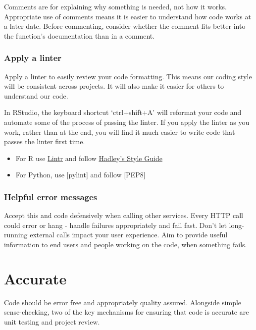 \documentclass[]{book}
\providecommand{\tightlist}{%
  \setlength{\itemsep}{0pt}\setlength{\parskip}{0pt}}
\begin{document}
Comments are for explaining why something is needed, not how it works. Appropriate use of comments means it is easier to understand how code works at a later date. Before commenting, consider whether the comment fits better into the function's documentation than in a comment.

\hypertarget{linter}{%
\subsection{Apply a linter}\label{linter}}

Apply a linter to easily review your code formatting. This means our coding style will be consistent across projects. It will also make it easier for others to understand our code.

In RStudio, the keyboard shortcut `ctrl+shift+A' will reformat your code and automate some of the process of passing the linter. If you apply the linter as you work, rather than at the end, you will find it much easier to write code that passes the linter first time.

\begin{itemize}
\tightlist
\item
  For R use \href{https://cran.r-project.org/web/packages/lintr/readme/README.html}{Lintr} and follow \href{http://adv-r.had.co.nz/Style.html}{Hadley's Style Guide}\\
\item
  For Python, use {[}pylint{]} and follow {[}PEP8{]}
\end{itemize}

\hypertarget{errors}{%
\subsection{Helpful error messages}\label{errors}}

Accept this and code defensively when calling other services.
Every HTTP call could error or hang - handle failures appropriately and fail fast. Don't let long-running external calls impact your user experience.
Aim to provide useful information to end users and people working on the code, when something fails.

\hypertarget{accurate}{%
\chapter{Accurate}\label{accurate}}

Code should be error free and appropriately quality assured. Alongside simple sense-checking, two of the key mechanisms for ensuring that code is accurate are unit testing and project review.
\end{document}
